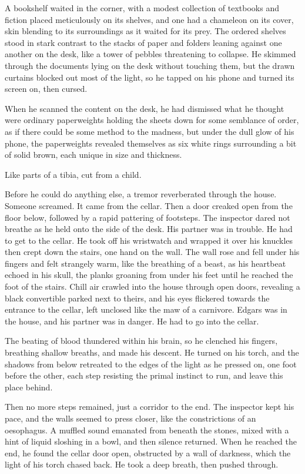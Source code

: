 A bookshelf waited in the corner, with a modest collection of textbooks and fiction placed meticulously on its shelves, and one had a chameleon on its cover, skin blending to its surroundings as it waited for its prey. The ordered shelves stood in stark contrast to the stacks of paper and folders leaning against one another on the desk, like a tower of pebbles threatening to collapse. He skimmed through the documents lying on the desk without touching them, but the drawn curtains blocked out most of the light, so he tapped on his phone and turned its screen on, then cursed.

When he scanned the content on the desk, he had dismissed what he thought were ordinary paperweights holding the sheets down for some semblance of order, as if there could be some method to the madness, but under the dull glow of his phone, the paperweights revealed themselves as six white rings surrounding a bit of solid brown, each unique in size and thickness.

Like parts of a tibia, cut from a child.

Before he could do anything else, a tremor reverberated through the house. Someone screamed. It came from the cellar. Then a door creaked open from the floor below, followed by a rapid pattering of footsteps. The inspector dared not breathe as he held onto the side of the desk. His partner was in trouble. He had to get to the cellar. He took off his wristwatch and wrapped it over his knuckles then crept down the stairs, one hand on the wall. The wall rose and fell under his fingers and felt strangely warm, like the breathing of a beast, as his heartbeat echoed in his skull, the planks groaning from under his feet until he reached the foot of the stairs. Chill air crawled into the house through open doors, revealing a black convertible parked next to theirs, and his eyes flickered towards the entrance to the cellar, left unclosed like the maw of a carnivore. Edgars was in the house, and his partner was in danger. He had to go into the cellar.

The beating of blood thundered within his brain, so he clenched his fingers, breathing shallow breaths, and made his descent. He turned on his torch, and the shadows from below retreated to the edges of the light as he pressed on, one foot before the other, each step resisting the primal instinct to run, and leave this place behind.

Then no more steps remained, just a corridor to the end. The inspector kept his pace, and the walls seemed to press closer, like the constrictions of an oesophagus. A muffled sound emanated from beneath the stones, mixed with a hint of liquid sloshing in a bowl, and then silence returned. When he reached the end, he found the cellar door open, obstructed by a wall of darkness, which the light of his torch chased back. He took a deep breath, then pushed through.

